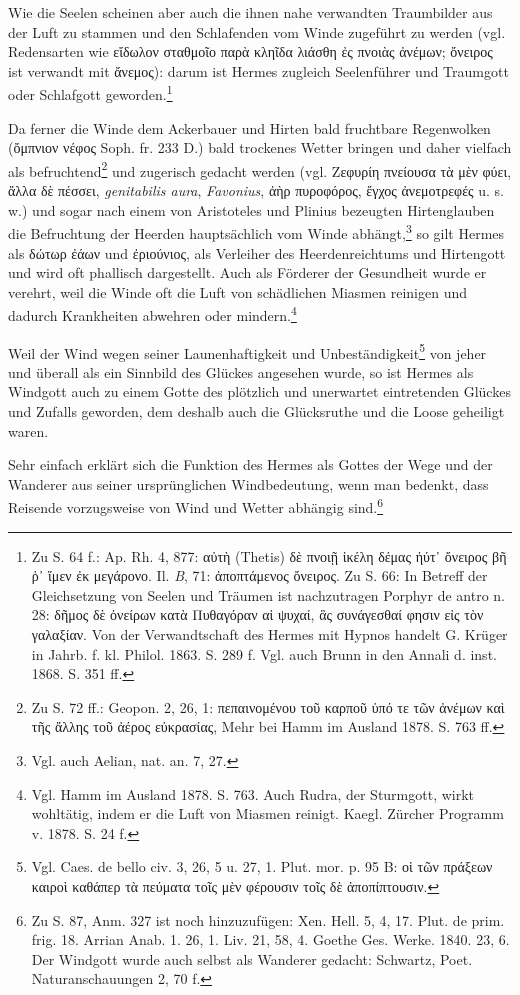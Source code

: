 \documentclass[a4paper, 11pt, oneside]{article}
\begin{document}
Wie die Seelen scheinen aber auch die ihnen nahe verwandten Traumbilder aus der Luft zu stammen und den Schlafenden vom Winde zugeführt zu werden (vgl. Redensarten wie εἴδωλον σταθμοῖο παρὰ κληῖδα λιάσθη ἐς πνοιὰς ἀνέμων; ὄνειρος ist verwandt mit ἄνεμος): darum ist Hermes zugleich Seelenführer und Traumgott oder Schlafgott geworden.\footnote{Zu S. 64 f.: Ap. Rh. 4, 877: αὐτὴ (Thetis) δὲ πνοιῇ ἰκέλη δέμας ἠύτ᾽ ὄνειρος βῆ ῥ᾽ ἵμεν ἐκ μεγάρονο. Il. \emph{B}, 71: ἀποπτάμενος ὄνειρος. Zu S. 66: In Betreff der Gleichsetzung von Seelen und Träumen ist nachzutragen Porphyr de antro n. 28: δῆμος δὲ ὀνείρων κατὰ Πυθαγόραν αἱ ψυχαί, ἃς συνάγεσθαί φησιν εἰς τὸν γαλαξίαν. Von der Verwandtschaft des Hermes mit Hypnos handelt G. Krüger in Jahrb. f. kl. Philol. 1863. S. 289 f. Vgl. auch Brunn in den Annali d. inst. 1868. S. 351 ff.}

Da ferner die Winde dem Ackerbauer und Hirten bald fruchtbare Regenwolken (ὄμπνιον νέφος Soph. fr. 233 D.) bald trockenes Wetter bringen und daher vielfach als befruchtend\footnote{Zu S. 72 ff.: Geopon. 2, 26, 1: πεπαινομένου τοῦ καρποῦ ὑπό τε τῶν ἀνέμων καὶ τῆς ἄλλης τοῦ ἀέρος εὐκρασίας, Mehr bei Hamm im Ausland 1878. S. 763 ff.} und zugerisch gedacht werden (vgl. Ζεφυρίη πνείουσα τὰ μὲν φύει, ἄλλα δὲ πέσσει, \emph{genitabilis aura}, \emph{Favonius}, ἀὴρ πυροφόρος, ἔγχος ἀνεμοτρεφές u. s. w.) und sogar nach einem von Aristoteles und Plinius bezeugten Hirtenglauben die Befruchtung der Heerden hauptsächlich vom Winde abhängt,\footnote{Vgl. auch Aelian, nat. an. 7, 27.} so gilt Hermes als δώτωρ ἐάων und ἐριούνιος, als Verleiher des Heerdenreichtums und Hirtengott und wird oft phallisch dargestellt. Auch als Förderer der Gesundheit wurde er verehrt, weil die Winde oft die Luft von schädlichen Miasmen reinigen und dadurch Krankheiten abwehren oder mindern.\footnote{Vgl. Hamm im Ausland 1878. S. 763. Auch Rudra, der Sturmgott, wirkt wohltätig, indem er die Luft von Miasmen reinigt. Kaegl. Zürcher Programm v. 1878. S. 24 f.}

Weil der Wind wegen seiner Launenhaftigkeit und Unbeständigkeit\footnote{Vgl. Caes. de bello civ. 3, 26, 5 u. 27, 1. Plut. mor. p. 95 B: οἱ τῶν πράξεων καιροὶ καθάπερ τὰ πεύματα τοῖς μὲν φέρουσιν τοῖς δὲ ἀποπίπτουσιν.} von jeher und überall als ein Sinnbild des Glückes angesehen wurde, so ist Hermes als Windgott auch zu einem Gotte des plötzlich und unerwartet eintretenden Glückes und Zufalls geworden, dem deshalb auch die Glücksruthe und die Loose geheiligt waren.

Sehr einfach erklärt sich die Funktion des Hermes als Gottes der Wege und der Wanderer aus seiner ursprünglichen Windbedeutung, wenn man bedenkt, dass Reisende vorzugsweise von Wind und Wetter abhängig sind.\footnote{Zu S. 87, Anm. 327 ist noch hinzuzufügen: Xen. Hell. 5, 4, 17. Plut. de prim. frig. 18. Arrian Anab. 1. 26, 1. Liv. 21, 58, 4. Goethe Ges. Werke. 1840. 23, 6. Der Windgott wurde auch selbst als Wanderer gedacht: Schwartz, Poet. Naturanschauungen 2, 70 f.}
\end{document}
